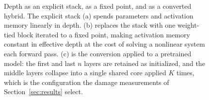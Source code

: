 \begin{figure}[t]
\caption{Depth as an explicit stack, as a fixed point, and as a converted
hybrid. The explicit stack (a) spends parameters and activation memory linearly
in depth. \EqLM{} (b) replaces the stack with one weight-tied block iterated to
a fixed point, making activation memory constant in effective depth at the cost
of solving a nonlinear system each forward pass. \KineticLM{} (c) is the
conversion applied to a pretrained model: the first and last $n$ layers are
retained as initialized, and the middle layers collapse into a single shared
core applied $K$ times, which is the configuration the damage measurements of
Section~\ref{sec:results} select.}
\label{fig:topologies}
\end{figure}



